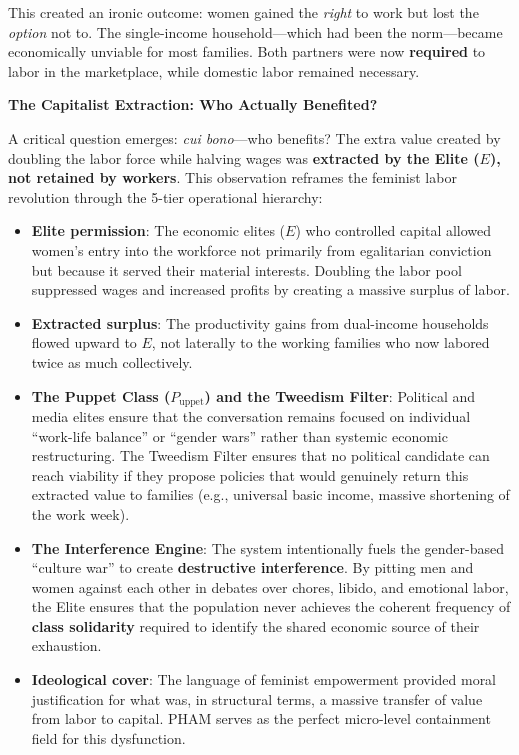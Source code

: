 \documentclass[12pt,openany]{book}
\numberwithin{equation}{chapter}
\begin{document}
This created an ironic outcome: women gained the \textit{right} to work but lost the \textit{option} not to. The single-income household---which had been the norm---became economically unviable for most families. Both partners were now \textbf{required} to labor in the marketplace, while domestic labor remained necessary.

\textbf{The Capitalist Extraction: Who Actually Benefited?}

A critical question emerges: \textit{cui bono}---who benefits? The extra value created by doubling the labor force while halving wages was \textbf{extracted by the Elite ($E$), not retained by workers}. This observation reframes the feminist labor revolution through the 5-tier operational hierarchy:

\begin{itemize}
    \item \textbf{Elite permission}: The economic elites ($E$) who controlled capital allowed women's entry into the workforce not primarily from egalitarian conviction but because it served their material interests. Doubling the labor pool suppressed wages and increased profits by creating a massive surplus of labor.
    
    \item \textbf{Extracted surplus}: The productivity gains from dual-income households flowed upward to $E$, not laterally to the working families who now labored twice as much collectively.
    
    \item \textbf{The Puppet Class ($P_{\text{uppet}}$) and the Tweedism Filter}: Political and media elites ensure that the conversation remains focused on individual ``work-life balance'' or ``gender wars'' rather than systemic economic restructuring. The Tweedism Filter ensures that no political candidate can reach viability if they propose policies that would genuinely return this extracted value to families (e.g., universal basic income, massive shortening of the work week).
    
    \item \textbf{The Interference Engine}: The system intentionally fuels the gender-based ``culture war'' to create \textbf{destructive interference}. By pitting men and women against each other in debates over chores, libido, and emotional labor, the Elite ensures that the population never achieves the coherent frequency of \textbf{class solidarity} required to identify the shared economic source of their exhaustion.
    
    \item \textbf{Ideological cover}: The language of feminist empowerment provided moral justification for what was, in structural terms, a massive transfer of value from labor to capital. PHAM serves as the perfect micro-level containment field for this dysfunction.
\end{itemize}
\end{document}
